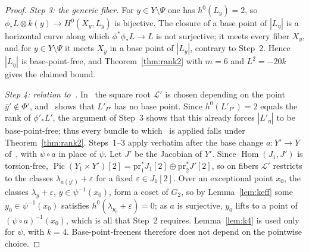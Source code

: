 \documentclass[11pt]{article}
\theoremstyle{definition}
\theoremstyle{remark}
\DeclareMathOperator{\Pic}{Pic}
\newcommand{\cL}{\mathcal{L}}
\begin{document}
\begin{proof}
\emph{Step 3: the generic fiber.} For $y\in Y\setminus\Psi$ one has $h^0(L_y)=2$,
so $\phi_*L\otimes k(y)\to H^0(X_y,L_y)$ is bijective. The closure of a base point
of $|L_\eta|$ is a horizontal curve along which $\phi^*\phi_*L\to L$ is not
surjective; it meets every fiber $X_y$, and for $y\in Y\setminus\Psi$ it meets $X_y$
in a base point of $|L_y|$, contrary to Step~2. Hence $|L_\eta|$ is
base-point-free, and Theorem~\ref{thm:rank2} with $m=6$ and $L^2=-20k$ gives the
claimed bound.

\emph{Step 4: relation to~\cite{So26}.} In~\cite[\S6.3.3]{So26} the square root
$\cL'$ is chosen depending on the point $\bar y'\notin\Phi'$, and~\cite[Lemma~3]{So26}
shows that $L'_{P'}$ has no base point. Since $h^0(L'_{P'})=2$ equals the rank of
$\phi'_*L'$, the argument of Step~3 shows that this already forces $|L'_\eta|$ to be
base-point-free; thus every bundle to which~\cite[(28)]{So26} is applied falls under
Theorem~\ref{thm:rank2}. Steps~1--3 apply verbatim after the base change $a\colon
Y'\to Y$ of~\cite[\S6.3.1]{So26}, with $\psi\circ a$ in place of $\psi$. Let $J'$ be
the Jacobian of $Y'$. Since $\operatorname{Hom}(J_1,J')$ is torsion-free,
$\Pic(Y_1\times Y')[2]=\mathrm{pr}_1^*J_1[2]\oplus\mathrm{pr}_2^*J'[2]$, so on fibers
$\cL'$ restricts to the classes $\lambda_{a(y')}+\varepsilon$ for a fixed
$\varepsilon\in J_1[2]$. Over an exceptional point $x_0$, the classes
$\lambda_y+\varepsilon$, $y\in\psi^{-1}(x_0)$, form a coset of $G_2$, so by
Lemma~\ref{lem:keff} some $y_0\in\psi^{-1}(x_0)$ satisfies
$h^0(\lambda_{y_0}+\varepsilon)=0$; as $a$ is surjective, $y_0$ lifts to a point of
$(\psi\circ a)^{-1}(x_0)$, which is all that Step~2 requires. Lemma~\ref{lem:k4} is
used only for $\psi$, with $k=4$. Base-point-freeness therefore does not depend on
the pointwise choice.
\end{proof}
\end{document}
